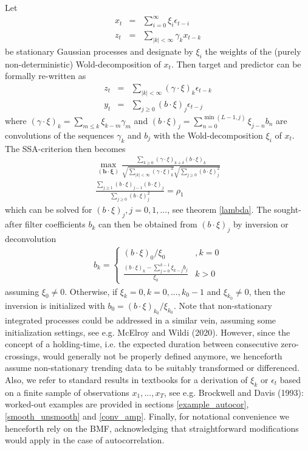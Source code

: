 \documentclass[a4paper]{article}
\begin{document}
Let 
\begin{eqnarray*}
x_t&=&\sum_{i=0}^{\infty}\xi_i\epsilon_{t-i}\\
z_t&=&\sum_{|k|<\infty}\gamma_k x_{t-k}
\end{eqnarray*} 
be stationary Gaussian processes and designate by $\xi_i$ the weights of the (purely non-deterministic) Wold-decomposition of $x_t$. %
Then target and predictor can be formally re-written as 
\begin{eqnarray*}
z_t&=&\sum_{|k|<\infty}(\gamma\cdot\xi)_k \epsilon_{t-k}\\
y_t&=&\sum_{j\geq 0} (b\cdot\xi)_j\epsilon_{t-j}
\end{eqnarray*} 
where $(\gamma\cdot\xi)_k=\sum_{m\leq k} \xi_{k-m}\gamma_m$ and $(b\cdot\xi)_j=\sum_{n=0}^{\min(L-1,j)} \xi_{j-n}b_n $ are convolutions of the sequences $\gamma_k$ and $b_j$ with the Wold-decomposition $\xi_i$ of $x_t$. The SSA-criterion then becomes 
\begin{eqnarray}\label{gen_stat_x}
\max_{(\mathbf{b}\cdot\boldsymbol{\xi})}\frac{\sum_{k\geq 0} (\gamma\cdot\xi)_{k+\delta} (b\cdot\xi)_k}{\sqrt{\sum_{|k|<\infty} (\gamma\cdot\xi)_k^2}\sqrt{\sum_{j\geq 0} (b\cdot\xi)_j^2}}\\
\frac{\sum_{j\geq 1}(b\cdot\xi)_{j-1}(b\cdot\xi)_j}{\sum_{j\geq 0}(b\cdot\xi)_j^2}=\rho_1\nonumber
\end{eqnarray}
which can be solved for $(b\cdot\xi)_j, j=0,1,...$, see theorem \ref{lambda}.  The  sought-after filter coefficients $b_k$ can then be obtained from $(b\cdot\xi)_j$ by inversion or deconvolution
\begin{eqnarray}\label{con_inv}
b_k=\left\{\begin{array}{cc}(b\cdot\xi)_0/\xi_{0}&,k=0\\
\frac{(b\cdot\xi)_{k}-\sum_{j=0}^{k-1}\xi_{k-j}b_j}{\xi_0}&k>0\end{array}\right.
\end{eqnarray}
assuming $\xi_0\neq 0$. Otherwise, if $\xi_k=0, k=0,...,k_0-1$ and $\xi_{k_0}\neq 0$, then the inversion is initialized with $b_{0}=(b\cdot\xi)_{k_0}/\xi_{k_0}$. Note that non-stationary integrated processes could be addressed in a similar vein, assuming some initialization settings, see e.g. McElroy and Wildi (2020). However, since the concept of a holding-time, i.e. the expected duration between consecutive zero-crossings, would generally not be properly defined anymore, we henceforth assume non-stationary trending data to be suitably transformed or differenced. Also, we refer to standard results in textbooks for a derivation of $\xi_k$ or $\epsilon_t$ based on a finite sample of observations $x_1,...,x_T$, see e.g. Brockwell and Davis (1993): worked-out examples are provided in sections \ref{example_autocor}, \ref{smooth_unsmooth} and \ref{conv_amp}.  Finally, for notational convenience we henceforth rely on the BMF, acknowledging that straightforward modifications would apply in the case of autocorrelation.     
\end{document}
